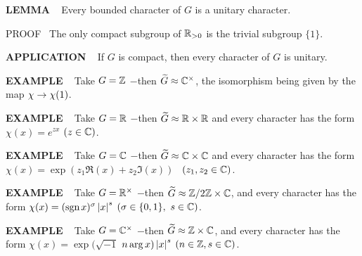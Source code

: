 \vspace{0.1cm}

\begin{x}{\small\bf LEMMA} \ %
Every bounded character of $G$ is a unitary character.

\vspace{0.1cm}

PROOF \  The only compact subgroup of $\mathbb{R}_{>0}$ is the trivial subgroup $\{1\}$.
\end{x}


\vspace{0.1cm}

\begin{x}{\small\bf APPLICATION} \ %
If $G$ is compact, then every character of $G$ is unitary.
\end{x}


\begin{x}{\small\bf EXAMPLE} \ %
Take $G = \mathbb{Z}$ $-$then $\widetilde{G} \approx \mathbb{C}^\times$, the isomorphism being given by the map $\chi \rightarrow \chi (1)$.
\end{x}

\vspace{0.1cm}


\begin{x}{\small\bf EXAMPLE} \ %
Take $G = \mathbb{R}$ $-$then $\widetilde{G} \approx \mathbb{R} \times \mathbb{R} $ and every character has the form 
$\chi (x) = e^{zx}$  $(z \in \mathbb{C})$.
\end{x}

\vspace{0.1cm}


\begin{x}{\small\bf EXAMPLE} \ %
Take $G = \mathbb{C}$ $-$then $\widetilde{G} \approx \mathbb{C} \times \mathbb{C} $ and every character has the form 
$\chi (x) = \exp(z_1 \Re(x) + z_2 \Im(x))$  \ $(z_1, z_2 \in \mathbb{C})$.
\end{x}
\vspace{0.1cm}

\begin{x}{\small\bf EXAMPLE} \ %
Take $G = \mathbb{R}^\times$ $-$then $\widetilde{G} \approx \mathbb{Z}/ 2 \mathbb{Z} \times \mathbb{C}$, and every character has the form 
$\chi (x) = (\text{sgn}\hspace{0.05cm} x)^\sigma \left\vert x\right\vert^s$ $(\sigma \in \{0,1\}, \ s \in \mathbb{C})$.
\end{x}
\vspace{0.1cm}

\begin{x}{\small\bf EXAMPLE} \ %
Take $G = \mathbb{C}^\times$ $-$then $\widetilde{G} \approx \mathbb{Z} \times \mathbb{C}$, 
and every character has the form $ \chi (x) = \exp(\sqrt{-1} $ $n \arg x) \left\vert x\right\vert^s$ $(n \in \mathbb{Z}, s \in \mathbb{C})$.
\end{x}

